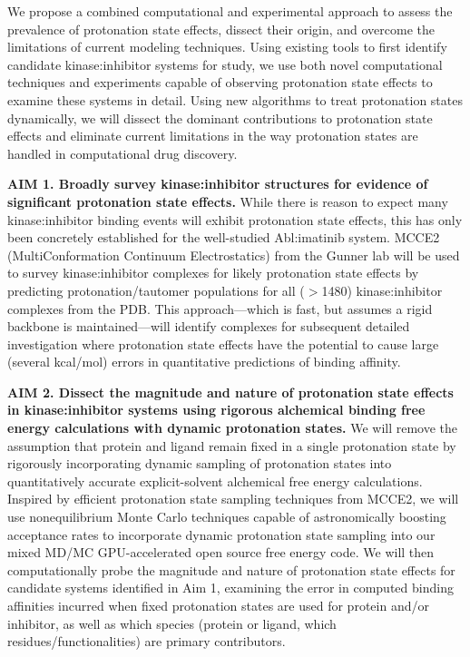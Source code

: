 \documentclass[11pt]{article}
\begin{document}
We propose a combined computational and experimental approach to assess the prevalence of protonation state effects, dissect their origin, and overcome the limitations of current modeling techniques.
Using existing tools to first identify candidate kinase:inhibitor systems for study, we use both novel computational techniques and experiments capable of observing protonation state effects to examine these systems in detail.
Using new algorithms to treat protonation states dynamically, we will dissect the dominant contributions to protonation state effects and eliminate current limitations in the way protonation states are handled in computational drug discovery.

{\bf AIM 1. Broadly survey kinase:inhibitor structures for evidence of significant protonation state effects.} 
While there is reason to expect many kinase:inhibitor binding events will exhibit protonation state effects, this has only been concretely established for the well-studied Abl:imatinib system.  
MCCE2 (MultiConformation Continuum Electrostatics) from the Gunner lab will be used to survey kinase:inhibitor complexes for likely protonation state effects by predicting protonation/tautomer populations for all ($>$1480) kinase:inhibitor complexes from the PDB.
This approach---which is fast, but assumes a rigid backbone is maintained---will identify complexes for subsequent detailed investigation where protonation state effects have the potential to cause large (several kcal/mol) errors in quantitative predictions of binding affinity.

{\bf AIM 2. Dissect the magnitude and nature of protonation state effects in kinase:inhibitor systems using rigorous alchemical binding free energy calculations with dynamic protonation states.}
We will remove the assumption that protein and ligand remain fixed in a single protonation state by rigorously incorporating dynamic sampling of protonation states into quantitatively accurate explicit-solvent alchemical free energy calculations.
Inspired by efficient protonation state sampling techniques from MCCE2, we will use nonequilibrium Monte Carlo techniques capable of astronomically boosting acceptance rates to incorporate dynamic protonation state sampling into our mixed MD/MC GPU-accelerated open source free energy code.
We will then computationally probe the magnitude and nature of protonation state effects for candidate systems identified in Aim 1, examining the error in computed binding affinities incurred when fixed protonation states are used for protein and/or inhibitor, as well as which species (protein or ligand, which residues/functionalities) are primary contributors.  
\end{document}
